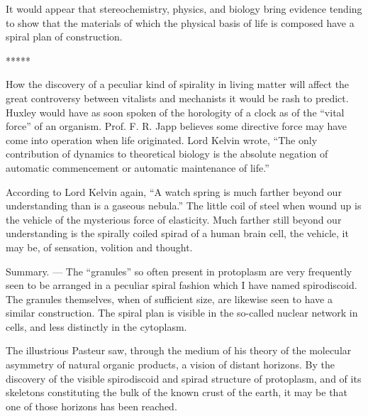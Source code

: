 \documentclass[a4paper, 12pt, oneside]{article}
\begin{document}
It would appear that stereochemistry, physics, and biology bring evidence tending to show that the materials of which the physical basis of life is composed have a spiral plan of construction.

\centerline{*\hspace{15mm}*\hspace{15mm}*\hspace{15mm}*\hspace{15mm}*}
\bigskip

How the discovery of a peculiar kind of spirality in living matter will affect the great controversy between vitalists and mechanists it would be rash to predict. Huxley would have as soon spoken of the horologity of a clock as of the ``vital force'' of an organism. Prof. F. R. Japp believes some directive force may have come into operation when life originated. Lord Kelvin wrote, ``The only contribution of dynamics to theoretical biology is the absolute negation of automatic commencement or automatic maintenance of life.''

According to Lord Kelvin again, ``A watch spring is much farther beyond our understanding than is a gaseous nebula.'' The little coil of steel when wound up is the vehicle of the mysterious force of elasticity. Much farther still beyond our understanding is the spirally coiled spirad of a human brain cell, the vehicle, it may be, of sensation, volition and thought.

Summary. --- The ``granules'' so often present in protoplasm are very frequently seen to be arranged in a peculiar spiral fashion which I have named spirodiscoid. The granules themselves, when of sufficient size, are likewise seen to have a similar construction. The spiral plan is visible in the so-called nuclear network in cells, and less distinctly in the cytoplasm.

The illustrious Pasteur saw, through the medium of his theory of the molecular asymmetry of natural organic products, a vision of distant horizons. By the discovery of the visible spirodiscoid and spirad structure of protoplasm, and of its skeletons constituting the bulk of the known crust of the earth, it may be that one of those horizons has been reached.
\clearpage
\end{document}
